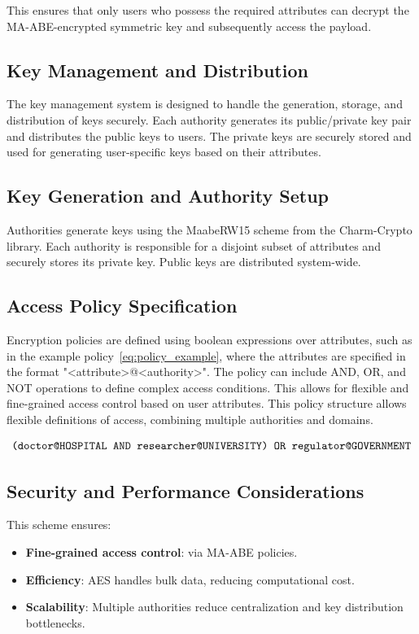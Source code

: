 \documentclass[cic,tc,english]{iiufrgs}
\begin{document}
            This ensures that only users who possess the required attributes can decrypt the MA-ABE-encrypted symmetric key and subsequently access the payload.


        \subsection{Key Management and Distribution}
            The key management system is designed to handle the generation, storage, and distribution of keys securely. Each authority generates its public/private key pair and distributes the public keys to users. The private keys are securely stored and used for generating user-specific keys based on their attributes.

        \subsection{Key Generation and Authority Setup}
            Authorities generate keys using the MaabeRW15 scheme from the Charm-Crypto library. Each authority is responsible for a disjoint subset of attributes and securely stores its private key. Public keys are distributed system-wide.

        \subsection{Access Policy Specification}
            Encryption policies are defined using boolean expressions over attributes, such as in the example policy~\ref{eq:policy_example}, where the attributes are specified in the format "<attribute>@<authority>". The policy can include AND, OR, and NOT operations to define complex access conditions. This allows for flexible and fine-grained access control based on user attributes.
            This policy structure allows flexible definitions of access, combining multiple authorities and domains.

            \begin{equation}
                \label{eq:policy_example}
                \texttt{(\allowbreak doctor@HOSPITAL \allowbreak AND \allowbreak researcher@UNIVERSITY) \allowbreak OR \allowbreak regulator@GOVERNMENT}
            \end{equation}


        \subsection{Security and Performance Considerations}
            This scheme ensures:
            \begin{itemize}
            \item \textbf{Fine-grained access control}: via MA-ABE policies.
            \item \textbf{Efficiency}: AES handles bulk data, reducing computational cost.
            \item \textbf{Scalability}: Multiple authorities reduce centralization and key distribution bottlenecks.
            \end{itemize}
\end{document}
